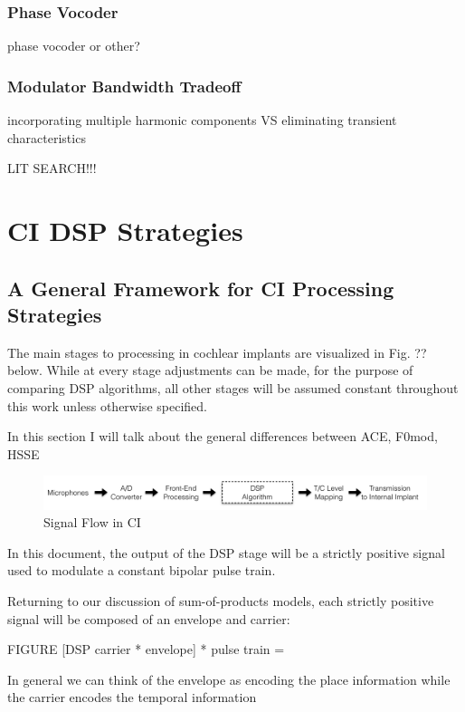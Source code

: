 \documentclass [11pt, proquest] {uwthesis}[2015/03/03]
\begin{document}
\subsection{Phase Vocoder}

phase vocoder or other?

\subsection{Modulator Bandwidth Tradeoff}

incorporating multiple harmonic components VS eliminating transient characteristics


LIT SEARCH!!!



\chapter{CI DSP Strategies}


\section{A General Framework for CI Processing Strategies}

The main stages to processing in cochlear implants are visualized in Fig. ?? below.  While at every stage adjustments can be made, for the purpose of comparing DSP algorithms, all other stages will be assumed constant throughout this work unless otherwise specified.

In this section I will talk about the general differences between ACE, F0mod, HSSE

\begin{figure}[!ht]
  \centering
    \includegraphics[width=1.0\textwidth]{CI_Signal_FlowTEMP}   
    \caption{Signal Flow in CI}
\end{figure}

In this document, the output of the DSP stage will be a strictly positive signal used to modulate a constant bipolar pulse train.

Returning to our discussion of sum-of-products models, each strictly positive signal will be composed of an envelope and carrier:

FIGURE
[DSP carrier * envelope] * pulse train = ~~~

In general we can think of the envelope as encoding the place information while the carrier encodes the temporal information
\end{document}
